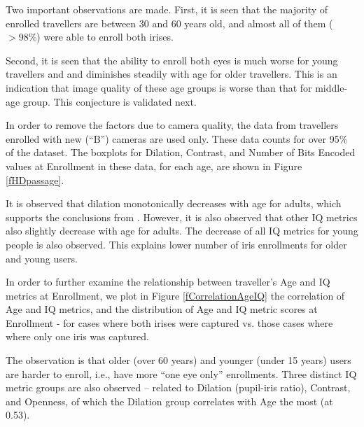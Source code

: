 \documentclass{cta-author}%
\begin{document}


Two important observations are made. 
First, it is seen that the majority of enrolled travellers are between 30 and 60 years old, 
and almost all of them ($>98\%$) were able to enroll both irises.

Second, it is seen that 
the ability to enroll both eyes is much worse for young travellers and  and diminishes steadily with age for older travellers. 
This is an indication that image quality of these age groups  is worse than that for middle-age group.
This conjecture is  validated next. 

In order to remove the factors due to camera quality, the data from travellers enrolled with new  (``B'') cameras are used only.
These data counts for over 95\% of the dataset.
The boxplots for Dilation, Contrast, and Number of Bits Encoded values at Enrollment in these data, for each age, 
are shown in Figure \ref{fHDpassage}.

It is observed that dilation monotonically decreases with age for adults, 
which supports the conclusions from \cite{irexVI}.
However, it is also observed that other IQ metrics also slightly decrease with age for adults.
The decrease of all IQ metrics for young people is also observed. 
This explains lower number of iris enrollments for older and young users.

In order to further examine the relationship between traveller's Age and IQ metrics at Enrollment, we plot in Figure \ref{fCorrelationAgeIQ} 
the correlation of Age and IQ metrics, and  the distribution of  Age and IQ metric scores at Enrollment - for cases where both irises were captured vs. those cases where  where only one iris was captured.  

The observation is that  older (over 60 years) and younger (under 15 years) users are harder to enroll, i.e.,  have more ``one eye only'' enrollments.
Three distinct IQ metric groups  are also observed --  related to Dilation (pupil-iris ratio), Contrast, and Openness, 
of which the Dilation group correlates with Age the most (at 0.53).
\end{document}
